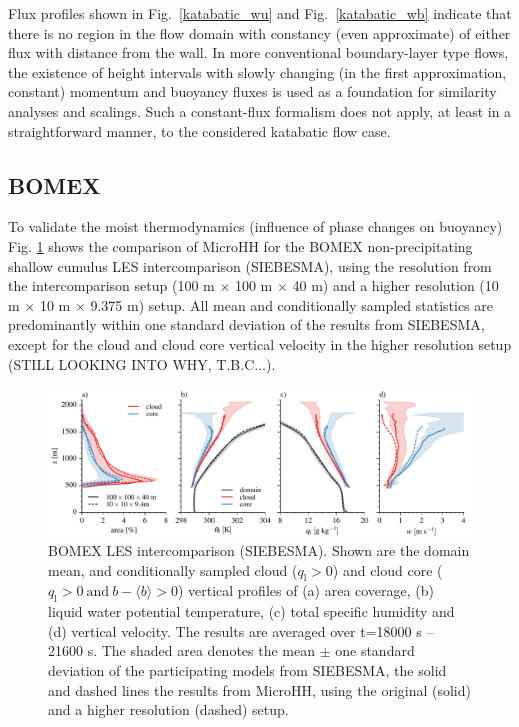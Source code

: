 \documentclass[gmd]{copernicus}
\begin{document}
Flux profiles shown in Fig.~\ref{katabatic_wu} and Fig.~\ref{katabatic_wb} indicate that there is no region in the flow domain with constancy (even approximate) of either flux with distance from the wall. In more conventional boundary-layer type flows, the existence of height intervals with slowly changing (in the first approximation, constant) momentum and buoyancy fluxes is used as a foundation for similarity analyses and scalings. Such a constant-flux formalism does not apply, at least in a straightforward manner, to the considered katabatic flow case.

\subsection{BOMEX}

To validate the moist thermodynamics (influence of phase changes on buoyancy) Fig. \ref{fig:bomex} shows the comparison of MicroHH for the BOMEX non-precipitating shallow cumulus LES intercomparison (SIEBESMA), using the resolution from the intercomparison setup (100 m $\times$ 100 m $\times$ 40 m) and a higher resolution (10 m $\times$ 10 m $\times$ 9.375 m) setup. All mean and conditionally sampled statistics are predominantly within one standard deviation of the results from SIEBESMA, except for the cloud and cloud core vertical velocity in the higher resolution setup (STILL LOOKING INTO WHY, T.B.C...). 

\begin{figure}[t]
\vspace*{2mm}
\begin{center}
\includegraphics[width=16.6cm]{figs/gmd_bomex_profs.pdf}
\end{center}
\caption{BOMEX LES intercomparison (SIEBESMA). Shown are the domain mean, and conditionally sampled cloud ($q_\mathrm{l} > 0$) and cloud core ($q_\mathrm{l}>0 \ \mathrm{and} \ b-\langle b \rangle > 0$) vertical profiles of (a) area coverage, (b) liquid water potential temperature, (c) total specific humidity and (d) vertical velocity. The results are averaged over t=18000 s -- 21600 s. The shaded area denotes the mean $\pm$ one standard deviation of the participating models from SIEBESMA, the solid and dashed lines the results from MicroHH, using the original (solid) and a higher resolution (dashed) setup.}
\label{fig:bomex}
\end{figure}
\end{document}
